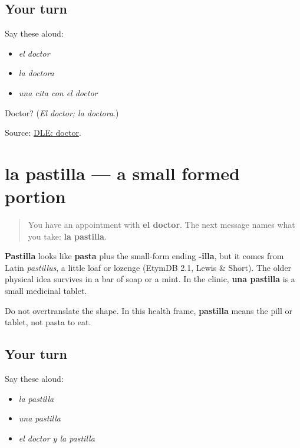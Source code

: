 \subsection*{Your turn}
Say these aloud:

\begin{itemize}
\raggedright
  \item \emph{el doctor}
  \item \emph{la doctora}
  \item \emph{una cita con el doctor}
\end{itemize}

\begin{tcolorbox}[breakable,colback=teal!4,colframe=teal!35!black,title={Before you move on}]
Doctor? (\emph{El doctor; la doctora}.)

Source: \href{https://dle.rae.es/doctor}{DLE: doctor}.
\end{tcolorbox}
\section[la pastilla]{la pastilla — a small formed portion}

\label{lesson:ES-C408-pastilla}



\begin{quote}
You have an appointment with \textbf{el doctor}. The next message names what you take: \textbf{la pastilla}.
\end{quote}

\begin{cousinweb}
\textbf{Pastilla} looks like \textbf{pasta} plus the small-form ending \textbf{-illa}, but it comes from Latin \emph{pastillus}, a little loaf or lozenge (EtymDB 2.1, Lewis \& Short). The older physical idea survives in a bar of soap or a mint. In the clinic, \textbf{una pastilla} is a small medicinal tablet.

Do not overtranslate the shape. In this health frame, \textbf{pastilla} means the pill or tablet, not pasta to eat.
\end{cousinweb}

\subsection*{Your turn}
Say these aloud:

\begin{itemize}
\raggedright
  \item \emph{la pastilla}
  \item \emph{una pastilla}
  \item \emph{el doctor y la pastilla}
\end{itemize}

